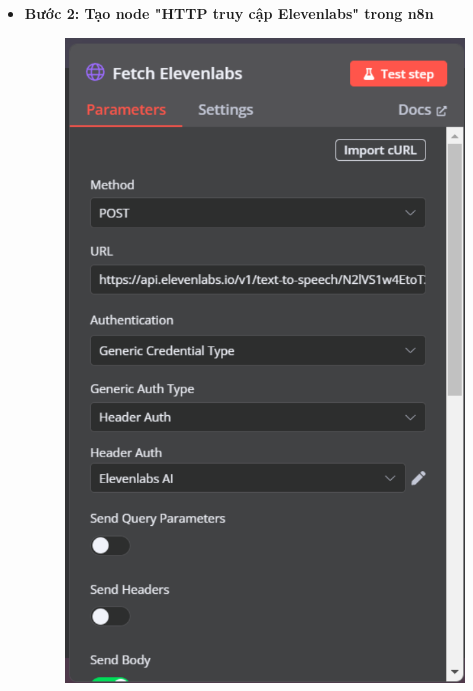 \begin{itemize}[label=]
\begin{figure}[H]
    \end{figure}

    \item \textbf{Bước 2: Tạo node "HTTP truy cập Elevenlabs" trong n8n}\\
    
    \begin{figure}[h]
 
    \centering
    \begin{minipage}{0.45\textwidth}
        \includegraphics[width=\linewidth]{images/Elevenlabs-2.pdf}
    \end{minipage}
    \hspace{5pt}

\end{figure}
\end{itemize}
